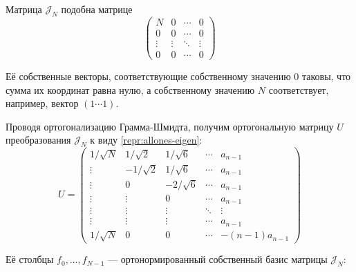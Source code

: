 \begin{lemma}
    Матрица \( \mathscr{J}_{N} \) подобна матрице
    \begin{equation}\label{repr:allones-eigen}
        \begin{pmatrix}
            N       & 0      & \cdots & 0 \\
            0       & 0      & \cdots & 0 \\
            \vdots  & \vdots & \ddots & \vdots  \\
            0       & 0      & \cdots & 0
        \end{pmatrix}
    \end{equation}

    Её собственные векторы, соответствующие собственному значению \( 0 \)
    таковы, что сумма их координат равна нулю,
    а собственному значению \( N \) соответствует, например,
    вектор \( \left(1\cdots 1\right) \).

    Проводя ортогонализацию Грамма-Шмидта,
    получим ортогональную матрицу \( U \) преобразования \( \mathscr{J}_{N} \)
    к виду \eqref{repr:allones-eigen}:
    \begin{equation}\label{eq:diagtransform}
    U =
    \begin{pmatrix}
        1/\sqrt N &  1/\sqrt2 & 1/\sqrt6   & \cdots & a_{n-1} \\
        \vdots    & -1/\sqrt2 & 1/\sqrt6   & \cdots & a_{n-1} \\
        \vdots    & 0         & -2/\sqrt6  & \cdots & a_{n-1} \\
        \vdots    & \vdots    & 0          & \cdots & a_{n-1} \\
        \vdots    & \vdots    & \vdots     & \ddots & \vdots  \\
        \vdots    & \vdots    & \vdots     & \cdots & a_{n-1} \\
        1/\sqrt N & 0         & 0          & \cdots & -(n-1)a_{n-1}
        \end{pmatrix}
        \end{equation}

        \begin{minipage}{0.9\textwidth}
            Её столбцы \( f_0, \ldots, f_{N-1} \)
            --- ортонормированный собственный базис матрицы \( \mathscr{J}_{N} \):


\end{minipage}
\end{lemma}
